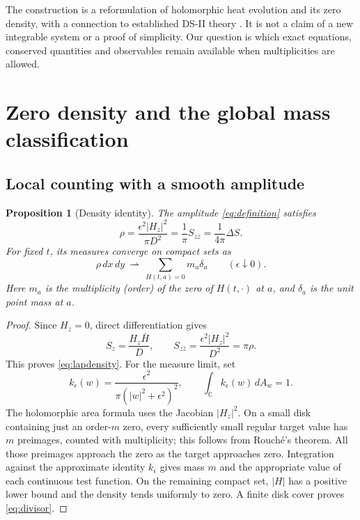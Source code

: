 \documentclass[11pt]{article}
\newcommand{\C}{\mathbb C}
\newcommand{\dd}{\,d}
\newcommand{\eps}{\epsilon}
\newtheorem{proposition}[theorem]{Proposition}
\theoremstyle{definition}
\theoremstyle{remark}
\begin{document}
The construction is a reformulation of holomorphic heat evolution and
its zero density, with a connection to established DS-II theory
\cite{KS,Taimanov}. It is not a claim of a new integrable system or a
proof of simplicity. Our question is which exact equations,
conserved quantities and observables remain available when
multiplicities are allowed.

\section{Zero density and the global mass classification}
\label{sec:mass}

\subsection{Local counting with a smooth amplitude}

\begin{proposition}[Density identity]
The amplitude \eqref{eq:definition} satisfies
\begin{equation}
 \rho=\frac{\eps^2|H_z|^2}{\pi D^2}
      =\frac1\pi S_{z\bar z}
      =\frac1{4\pi}\Delta S. \label{eq:lapdensity}
\end{equation}
For fixed $t$, its measures converge on compact sets as
\begin{equation}
 \rho\dd x\dd y\ \rightharpoonup\
 \sum_{H(t,a)=0}m_a\delta_a\qquad(\eps\downarrow0).
 \label{eq:divisor}
\end{equation}
Here $m_a$ is the multiplicity (order) of the zero of $H(t,\cdot)$
at $a$, and $\delta_a$ is the unit point mass at $a$.
\end{proposition}
\begin{proof}
Since $H_{\bar z}=0$, direct differentiation gives
\[
 S_z=\frac{H_z\bar H}{D},\qquad
 S_{z\bar z}=\frac{\eps^2|H_z|^2}{D^2}=\pi\rho.
\]
This proves \eqref{eq:lapdensity}. For the measure limit, set
\begin{equation}
 k_\eps(w)=\frac{\eps^2}{\pi(|w|^2+\eps^2)^2},
 \qquad \int_\C k_\eps(w)\dd A_w=1.
 \label{eq:targetkernel}
\end{equation}
The holomorphic area formula uses the Jacobian $|H_z|^2$.
On a small disk containing just an order-$m$ zero, every sufficiently
small regular target value has $m$ preimages, counted with multiplicity;
this follows from Rouch\'e's theorem. All those preimages approach the
zero as the target approaches zero. Integration against the approximate
identity $k_\eps$ gives mass $m$ and the appropriate value of each
continuous test function. On the remaining compact set, $|H|$ has a
positive lower bound and the density tends uniformly to zero. A finite
disk cover proves \eqref{eq:divisor}.
\end{proof}
\end{document}
